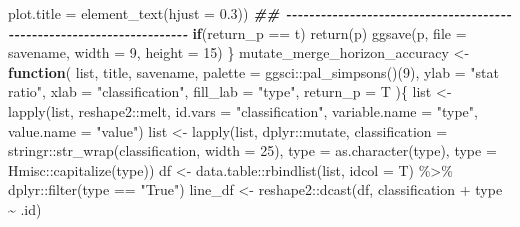 \documentclass[
]{article}
\newenvironment{Shaded}{\begin{snugshade}}{\end{snugshade}}
\newcommand{\AttributeTok}[1]{\textcolor[rgb]{0.77,0.63,0.00}{#1}}
\newcommand{\ControlFlowTok}[1]{\textcolor[rgb]{0.13,0.29,0.53}{\textbf{#1}}}
\newcommand{\DecValTok}[1]{\textcolor[rgb]{0.00,0.00,0.81}{#1}}
\newcommand{\DocumentationTok}[1]{\textcolor[rgb]{0.56,0.35,0.01}{\textbf{\textit{#1}}}}
\newcommand{\FloatTok}[1]{\textcolor[rgb]{0.00,0.00,0.81}{#1}}
\newcommand{\FunctionTok}[1]{\textcolor[rgb]{0.00,0.00,0.00}{#1}}
\newcommand{\NormalTok}[1]{#1}
\newcommand{\OtherTok}[1]{\textcolor[rgb]{0.56,0.35,0.01}{#1}}
\newcommand{\SpecialCharTok}[1]{\textcolor[rgb]{0.00,0.00,0.00}{#1}}
\newcommand{\StringTok}[1]{\textcolor[rgb]{0.31,0.60,0.02}{#1}}
\begin{document}
\begin{Shaded}
\begin{Highlighting}[]
            \AttributeTok{plot.title =} \FunctionTok{element\_text}\NormalTok{(}\AttributeTok{hjust =} \FloatTok{0.3}\NormalTok{))}
      \DocumentationTok{\#\# {-}{-}{-}{-}{-}{-}{-}{-}{-}{-}{-}{-}{-}{-}{-}{-}{-}{-}{-}{-}{-}{-}{-}{-}{-}{-}{-}{-}{-}{-}{-}{-}{-}{-}{-}{-}{-}{-}{-}{-}{-}{-}{-}{-}{-}{-}{-}{-}{-}{-}{-}{-}{-}{-}{-}{-}{-}{-}{-}{-}{-}{-}{-}{-}{-}{-}{-}{-}{-}{-} }
      \ControlFlowTok{if}\NormalTok{(return\_p }\SpecialCharTok{==}\NormalTok{ t)}
        \FunctionTok{return}\NormalTok{(p)}
      \FunctionTok{ggsave}\NormalTok{(p, }\AttributeTok{file =}\NormalTok{ savename, }\AttributeTok{width =} \DecValTok{9}\NormalTok{, }\AttributeTok{height =} \DecValTok{15}\NormalTok{)}
\NormalTok{  \}}
\NormalTok{mutate\_merge\_horizon\_accuracy }\OtherTok{\textless{}{-}} 
  \ControlFlowTok{function}\NormalTok{(}
\NormalTok{           list,}
\NormalTok{           title,}
\NormalTok{           savename,}
           \AttributeTok{palette =}\NormalTok{ ggsci}\SpecialCharTok{::}\FunctionTok{pal\_simpsons}\NormalTok{()(}\DecValTok{9}\NormalTok{),}
           \AttributeTok{ylab =} \StringTok{"stat ratio"}\NormalTok{,}
           \AttributeTok{xlab =} \StringTok{"classification"}\NormalTok{,}
           \AttributeTok{fill\_lab =} \StringTok{"type"}\NormalTok{,}
           \AttributeTok{return\_p =}\NormalTok{ T}
\NormalTok{           )\{}
\NormalTok{    list }\OtherTok{\textless{}{-}} \FunctionTok{lapply}\NormalTok{(list, reshape2}\SpecialCharTok{::}\NormalTok{melt,}
                   \AttributeTok{id.vars =} \StringTok{"classification"}\NormalTok{,}
                   \AttributeTok{variable.name =} \StringTok{"type"}\NormalTok{,}
                   \AttributeTok{value.name =} \StringTok{"value"}\NormalTok{)}
\NormalTok{    list }\OtherTok{\textless{}{-}} \FunctionTok{lapply}\NormalTok{(list, dplyr}\SpecialCharTok{::}\NormalTok{mutate,}
                   \AttributeTok{classification =}\NormalTok{ stringr}\SpecialCharTok{::}\FunctionTok{str\_wrap}\NormalTok{(classification, }\AttributeTok{width =} \DecValTok{25}\NormalTok{),}
                   \AttributeTok{type =} \FunctionTok{as.character}\NormalTok{(type),}
                   \AttributeTok{type =}\NormalTok{ Hmisc}\SpecialCharTok{::}\FunctionTok{capitalize}\NormalTok{(type))}
\NormalTok{    df }\OtherTok{\textless{}{-}}\NormalTok{ data.table}\SpecialCharTok{::}\FunctionTok{rbindlist}\NormalTok{(list, }\AttributeTok{idcol =}\NormalTok{ T) }\SpecialCharTok{\%\textgreater{}\%} 
\NormalTok{      dplyr}\SpecialCharTok{::}\FunctionTok{filter}\NormalTok{(type }\SpecialCharTok{==} \StringTok{"True"}\NormalTok{)}
\NormalTok{    line\_df }\OtherTok{\textless{}{-}}\NormalTok{ reshape2}\SpecialCharTok{::}\FunctionTok{dcast}\NormalTok{(df, classification }\SpecialCharTok{+}\NormalTok{ type }\SpecialCharTok{\textasciitilde{}}\NormalTok{ .id)}

\end{Highlighting}
\end{Shaded}
\end{document}
